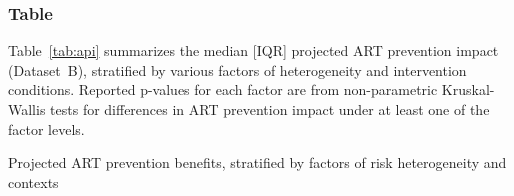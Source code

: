 \subsubsection{Table}
Table~\ref{tab:api} summarizes the median [IQR] projected ART prevention impact (Dataset~B),
stratified by various factors of heterogeneity and intervention conditions.
Reported p-values for each factor are from non-parametric Kruskal-Wallis tests
for differences in ART prevention impact under at least one of the factor levels.
\begin{table}[H]
  \centering
  \caption{Projected ART prevention benefits,
    stratified by factors of risk heterogeneity and contexts}
  
  \label{tab:api}
\end{table}